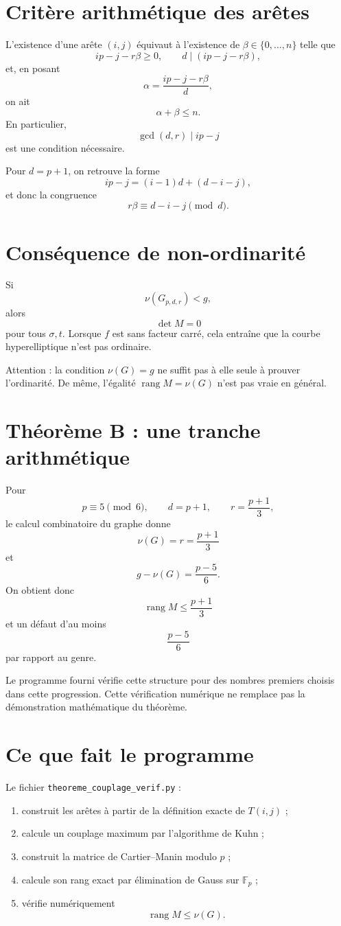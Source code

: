 \documentclass[11pt,a4paper]{article}
\begin{document}
\section{Critère arithmétique des arêtes}

L'existence d'une arête $(i,j)$ équivaut à l'existence de
$\beta\in\{0,\ldots,n\}$ telle que
\[
 ip-j-r\beta\geq0,\qquad
 d\mid(ip-j-r\beta),
\]
et, en posant
\[
 \alpha=\frac{ip-j-r\beta}{d},
\]
on ait
\[
 \alpha+\beta\leq n.
\]
En particulier,
\[
 \gcd(d,r)\mid ip-j
\]
est une condition nécessaire.

Pour $d=p+1$, on retrouve la forme
\[
 ip-j=(i-1)d+(d-i-j),
\]
et donc la congruence
\[
 r\beta\equiv d-i-j\pmod d.
\]

\section{Conséquence de non-ordinarité}

Si
\[
 \nu(G_{p,d,r})<g,
\]
alors
\[
 \det M=0
\]
pour tous $\sigma,t$. Lorsque $f$ est sans facteur carré, cela entraîne
que la courbe hyperelliptique n'est pas ordinaire.

Attention : la condition $\nu(G)=g$ ne suffit pas à elle seule à prouver
l'ordinarité. De même, l'égalité
$\operatorname{rang}M=\nu(G)$ n'est pas vraie en général.

\section{Théorème B : une tranche arithmétique}

Pour
\[
 p\equiv5\pmod6,\qquad d=p+1,\qquad
 r=\frac{p+1}{3},
\]
le calcul combinatoire du graphe donne
\[
 \nu(G)=r=\frac{p+1}{3}
\]
et
\[
 g-\nu(G)=\frac{p-5}{6}.
\]
On obtient donc
\[
 \operatorname{rang}M\leq\frac{p+1}{3}
\]
et un défaut d'au moins
\[
 \frac{p-5}{6}
\]
par rapport au genre.

Le programme fourni vérifie cette structure pour des nombres premiers
choisis dans cette progression. Cette vérification numérique ne remplace
pas la démonstration mathématique du théorème.

\section{Ce que fait le programme}

Le fichier \texttt{theoreme\_couplage\_verif.py} :

\begin{enumerate}
\item construit les arêtes à partir de la définition exacte de $T(i,j)$ ;
\item calcule un couplage maximum par l'algorithme de Kuhn ;
\item construit la matrice de Cartier--Manin modulo $p$ ;
\item calcule son rang exact par élimination de Gauss sur $\mathbb F_p$ ;
\item vérifie numériquement
\[
\operatorname{rang}M\leq\nu(G).
\]
\end{enumerate}
\end{document}
